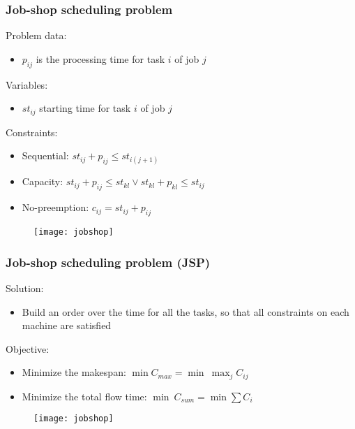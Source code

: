 \begin{frame} \frametitle{Job-shop scheduling problem}
\pause
Problem data:
\begin{itemize}[<+->]
\item $p_{ij}$ is the processing time for task $i$ of job $j$ 
\end{itemize}

\medskip

Variables:
\begin{itemize}[<+->]
\item $st_{ij}$ starting time for task $i$ of job $j$ 
\end{itemize}


\medskip

Constraints:
\begin{itemize}[<+->]
\item Sequential: $st_{ij} + p_{ij} \leq st_{i(j+1)}$
\item Capacity: $st_{ij} + p_{ij} \leq st_{kl} \vee st_{kl} + p_{kl} \leq st_{ij}$
\item No-preemption: $c_{ij} = st_{ij} + p_{ij}$
\end{itemize}

\medskip

\begin{figure}
	\centering
	\texttt{[image: jobshop]}
\end{figure}

\end{frame}

\begin{frame} \frametitle{Job-shop scheduling problem (JSP)}
\pause
Solution:\pause
\begin{itemize}[<+->]
\item Build an order over the time for all the tasks, so that all constraints on each machine are satisfied
\end{itemize}

\medskip

Objective:
\begin{itemize}[<+->]
\item Minimize the makespan: $\operatorname*{min} C_{max} = \operatorname*{min}~\operatorname*{max}_{j}  C_{ij}$
\item Minimize the total flow time: $\operatorname*{min}~C_{sum} = \operatorname*{min} \sum C_{i}$
\end{itemize}


\medskip

\begin{figure}
	\centering
	\texttt{[image: jobshop]}
\end{figure}

\end{frame}


